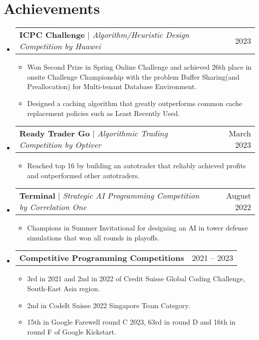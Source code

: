 \documentclass[letterpaper,11pt]{article}
\makeatletter
\newcommand{\resumeItem}[1]{
  \item\footnotesize{
    {#1 \vspace{-2pt}}
  }
}
\newcommand{\resumeProjectHeading}[2]{
    \item
    \begin{tabular*}{0.97\textwidth}{l@{\extracolsep{\fill}}r}
      \small#1 & #2 \\
    \end{tabular*}\vspace{-6pt}
}
\newcommand{\resumeSubHeadingListStart}{\begin{itemize}[leftmargin=0.15in, label={}]}
\newcommand{\resumeSubHeadingListEnd}{\end{itemize}}
\newcommand{\resumeItemListStart}{\begin{itemize}}
\newcommand{\resumeItemListEnd}{\end{itemize}\vspace{-7pt}}
\makeatother
\begin{document}
\section{Achievements}
    \resumeSubHeadingListStart
      \resumeProjectHeading
          {\textbf{ICPC Challenge} $|$ \emph{Algorithm/Heuristic Design Competition by Huawei}}{2023}
          \resumeItemListStart
            \resumeItem{Won Second Prize in Spring Online Challenge and achieved 26th place in onsite Challenge Championship with the problem Buffer Sharing(and Preallocation) for Multi-tenant Database Environment. }
            \resumeItem{Designed a caching algorithm that greatly outperforms common cache replacement policies such as Least Recently Used. }
          \resumeItemListEnd
      \resumeProjectHeading
          {\textbf{Ready Trader Go} $|$ \emph{Algorithmic Trading Competition by Optiver}}{March 2023}
          \resumeItemListStart
            \resumeItem{Reached top 16 by building an autotrader that reliably achieved profits and outperformed other autotraders.}
          \resumeItemListEnd
      \resumeProjectHeading
          {\textbf{Terminal} $|$ \emph{Strategic AI Programming Competition by Correlation One}}{August 2022}
          \resumeItemListStart
            \resumeItem{Champions in Summer Invitational for designing an AI in tower defense simulations that won all rounds in playoffs.}
          \resumeItemListEnd
      \resumeProjectHeading
          {\textbf{Competitive Programming Competitions} \emph{}}{2021 -- 2023}
          \resumeItemListStart
            \resumeItem{3rd in 2021 and 2nd in 2022 of Credit Suisse Global Coding Challenge, South-East Asia region.}
            \resumeItem{2nd in CodeIt Suisse 2022 Singapore Team Category.}
            \resumeItem{15th in Google Farewell round C 2023, 63rd in round D and 16th in round F of Google Kickstart.}
          \resumeItemListEnd
    \resumeSubHeadingListEnd

\end{document}
